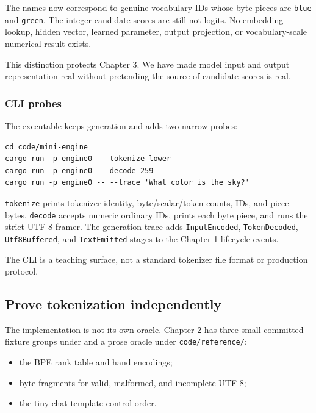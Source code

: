 \documentclass[
  10pt,
]{article}
\providecommand{\tightlist}{%
  \setlength{\itemsep}{0pt}\setlength{\parskip}{0pt}}
\begin{document}
The names now correspond to genuine vocabulary IDs whose byte pieces are
\texttt{blue} and \texttt{green}. The integer candidate scores are still
not logits. No embedding lookup, hidden vector, learned parameter,
output projection, or vocabulary-scale numerical result exists.

This distinction protects Chapter 3. We have made model input and output
representation real without pretending the source of candidate scores is
real.

\subsubsection{CLI probes}\label{cli-probes}

The executable keeps generation and adds two narrow probes:

\begin{verbatim}
cd code/mini-engine
cargo run -p engine0 -- tokenize lower
cargo run -p engine0 -- decode 259
cargo run -p engine0 -- --trace 'What color is the sky?'
\end{verbatim}

\texttt{tokenize} prints tokenizer identity, byte/scalar/token counts,
IDs, and piece bytes. \texttt{decode} accepts numeric ordinary IDs,
prints each byte piece, and runs the strict UTF-8 framer. The generation
trace adds \texttt{InputEncoded}, \texttt{TokenDecoded},
\texttt{Utf8Buffered}, and \texttt{TextEmitted} stages to the Chapter 1
lifecycle events.

The CLI is a teaching surface, not a standard tokenizer file format or
production protocol.

\subsection{Prove tokenization
independently}\label{prove-tokenization-independently}

The implementation is not its own oracle. Chapter 2 has three small
committed fixture groups under
\texttt{} and a prose
oracle under \texttt{code/reference/}:

\begin{itemize}
\tightlist
\item
  the BPE rank table and hand encodings;
\item
  byte fragments for valid, malformed, and incomplete UTF-8;
\item
  the tiny chat-template control order.
\end{itemize}
\end{document}
